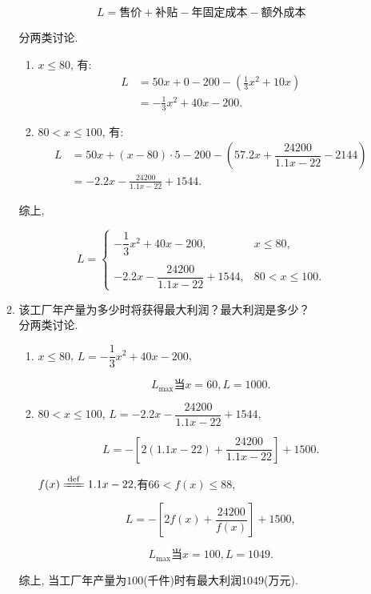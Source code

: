 \documentclass[8pt]{article}
\begin{document}
\begin{enumerate}[label=\arabic*.]
\begin{enumerate}[label=(\arabic*)]
					$$L = \text{售价} + \text{补贴} -\text{年固定成本} - \text{额外成本}$$

					分两类讨论.

					\begin{enumerate}[label=$\arabic*^{\circ}$]
						\item $x\leq 80$, 有:
							\begin{align*}
								L &= 50x + 0 - 200 - \left(\frac{1}{3}x^2+10x\right)\\
								&= -\frac{1}{3}x^2+40x-200.
							\end{align*}

						\item $80<x\leq 100$, 有:
							\begin{align*}
								L &= 50x + (x-80) \cdot 5 - 200 - \left(57.2x+\dfrac{24200}{1.1x-22}-2144\right)\\
								&= -2.2x- \frac{24200}{1.1x-22} +1544.
							\end{align*}
					\end{enumerate}

					综上, 

					$$L=\left\{\begin{array}{rl}-\dfrac{1}{3}x^2+40x-200,&x\leq 80,\\\\-2.2x- \dfrac{24200}{1.1x-22} + 1544,&80<x\leq 100.\end{array}\right.$$

				\item 该工厂年产量为多少时将获得最大利润？最大利润是多少？
					~\\

					分两类讨论.

					\begin{enumerate}[label=$\arabic*^{\circ}$]
						\item $x\leq 80$, $L=-\dfrac{1}{3}x^2+40x-200$,

							$$L_{\max}\text{当}x=60, L=1000.$$

						\item $80<x\leq 100$, $L=-2.2x- \dfrac{24200}{1.1x-22} +1544$,
							
							$$L=-\left[2(1.1x-22)+\frac{24200}{1.1x-22}\right]+1500.$$

							$f(x)\xlongequal{\mathrm{def}}1.1x-22, $有$66<f(x)\leq88$,

							$$L=-\left[2f(x)+\frac{24200}{f(x)}\right]+1500,$$

							$$L_{\max}\text{当}x=100, L=1049.$$
							
					\end{enumerate}

					综上, 当工厂年产量为$100$(千件)时有最大利润$1049$(万元).

			\end{enumerate}

	\end{enumerate}
\end{document}
